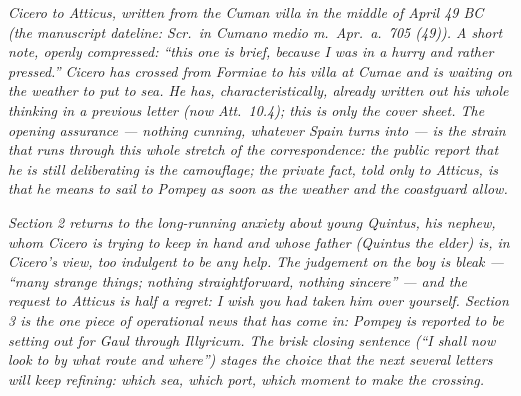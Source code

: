
\textit{Cicero to Atticus, written from the Cuman villa
in the middle of April 49 BC (the manuscript dateline:
\textit{Scr.\ in Cumano medio m.\ Apr.\ a.\ 705 (49)}).
A short note, openly compressed: ``this one is brief,
because I was in a hurry and rather pressed.'' Cicero
has crossed from Formiae to his villa at Cumae and is
waiting on the weather to put to sea. He has,
characteristically, already written out his whole
thinking in a previous letter (now Att.\ 10.4); this is
only the cover sheet. The opening assurance --- nothing
cunning, whatever Spain turns into --- is the strain
that runs through this whole stretch of the
correspondence: the public report that he is still
deliberating is the camouflage; the private fact, told
only to Atticus, is that he means to sail to Pompey as
soon as the weather and the coastguard allow.}

\textit{Section 2 returns to the long-running anxiety
about young Quintus, his nephew, whom Cicero is trying
to keep in hand and whose father (Quintus the elder)
is, in Cicero's view, too indulgent to be any help.
The judgement on the boy is bleak --- ``many strange
things; nothing straightforward, nothing sincere'' ---
and the request to Atticus is half a regret: I wish
you had taken him over yourself. Section 3 is the one
piece of operational news that has come in: Pompey is
reported to be setting out for Gaul through Illyricum.
The brisk closing sentence (``I shall now look to by
what route and where'') stages the choice that the
next several letters will keep refining: which sea,
which port, which moment to make the crossing.}
